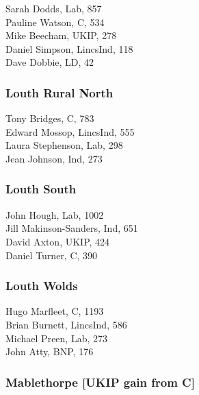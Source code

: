 \documentclass[a4paper,openany,10pt]{book}
\begin{document}


Sarah Dodds, Lab, 857\\
Pauline Watson, C, 534\\
Mike Beecham, UKIP, 278\\
Daniel Simpson, LincsInd, 118\\
Dave Dobbie, LD, 42\\


\subsubsection*{Louth Rural North}



Tony Bridges, C, 783\\
Edward Mossop, LincsInd, 555\\
Laura Stephenson, Lab, 298\\
Jean Johnson, Ind, 273\\


\subsubsection*{Louth South}



John Hough, Lab, 1002\\
{Jill Makinson-Sanders}, Ind, 651\\
David Axton, UKIP, 424\\
Daniel Turner, C, 390\\


\subsubsection*{Louth Wolds}



Hugo Marfleet, C, 1193\\
Brian Burnett, LincsInd, 586\\
Michael Preen, Lab, 273\\
John Atty, BNP, 176\\


\subsubsection*{Mablethorpe \hspace*{\fill}\nolinebreak[1]%
\enspace\hspace*{\fill}
[UKIP gain from C]}
\end{document}
